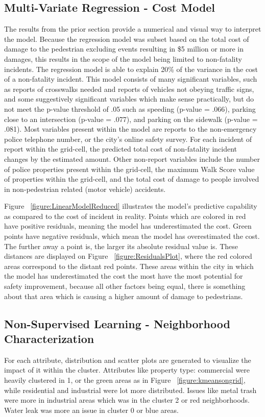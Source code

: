 \documentclass{llncs}
\begin{document}
\subsection{Multi-Variate Regression - Cost Model}
The results from the prior section provide a numerical and visual way to interpret the model. Because the regression model was subset based on the total cost of damage to the pedestrian excluding events resulting in \$5 million or more in damages, this results in the scope of the model being limited to non-fatality incidents. The regression model is able to explain 20\% of the variance in the cost of a non-fatality incident. This model consists of many significant variables, such as reports of crosswalks needed and reports of vehicles not obeying traffic signs, and some suggestively significant variables which make sense practically, but do not meet the p-value threshold of .05 such as speeding (p-value = .066), parking close to an intersection (p-value = .077), and parking on the sidewalk (p-value = .081). Most variables present within the model are reports to the non-emergency police telephone number, or the city’s online safety survey. For each incident of report within the grid-cell, the predicted total cost of non-fatality incident changes by the estimated amount. Other non-report variables include the number of police properties present within the grid-cell, the maximum Walk Score value of properties within the grid-cell, and the total cost of damage to people involved in non-pedestrian related (motor vehicle) accidents. 

Figure ~\ref{figure:LinearModelReduced} illustrates the model’s predictive capability as compared to the cost of incident in reality. Points which are colored in red have positive residuals, meaning the model has underestimated the cost. Green points have negative residuals, which mean the model has overestimated the cost. The further away a point is, the larger its absolute residual value is. These distances are displayed on Figure ~\ref{figure:ResidualsPlot}, where the red colored areas correspond to the distant red points. These areas within the city in which the model has underestimated the cost the most have the most potential for safety improvement, because all other factors being equal, there is something about that area which is causing a higher amount of damage to pedestrians.

\subsection{Non-Supervised Learning - Neighborhood Characterization}
For each attribute, distribution and scatter plots are generated to visualize the impact of it within the cluster. Attributes like property type: commercial were heavily clustered in 1, or the green areas as in Figure ~\ref{figure:kmeansongrid}, while residential and industrial were lot more distributed. Issues like metal trash were more in industrial areas which was in the cluster 2 or red neighborhoods. Water leak was more an issue in cluster 0 or blue areas.
\end{document}
